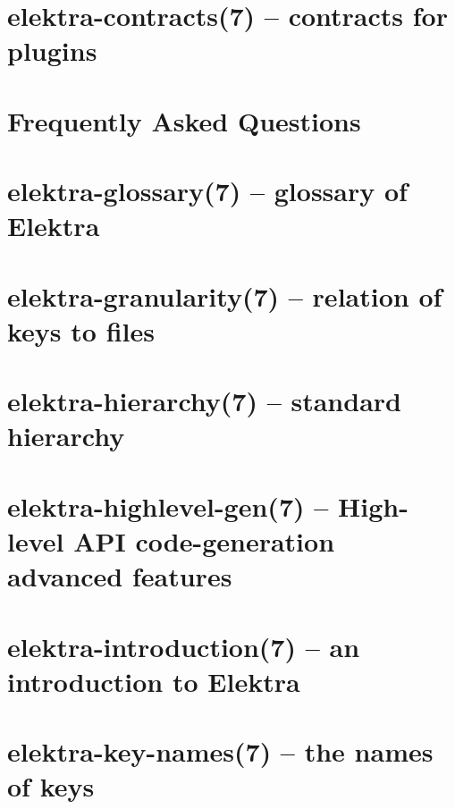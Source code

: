 \let\mypdfximage\pdfximage\def\pdfximage{\immediate\mypdfximage}\documentclass[twoside]{book}
\newcommand{\+}{\discretionary{\mbox{\scriptsize$\hookleftarrow$}}{}{}}
\begin{document}
\chapter{elektra-\/contracts(7) -- contracts for plugins}
\label{doc_help_elektra-contracts_md}

\chapter{Frequently Asked Questions}
\label{doc_help_elektra-faq_md}

\chapter{elektra-\/glossary(7) -- glossary of Elektra}
\label{doc_help_elektra-glossary_md}

\chapter{elektra-\/granularity(7) -- relation of keys to files}
\label{doc_help_elektra-granularity_md}

\chapter{elektra-\/hierarchy(7) -- standard hierarchy}
\label{doc_help_elektra-hierarchy_md}

\chapter{elektra-\/highlevel-\/gen(7) -- High-\/level API code-\/generation advanced features}
\label{doc_help_elektra-highlevel-gen_md}

\chapter{elektra-\/introduction(7) -- an introduction to Elektra}
\label{doc_help_elektra-introduction_md}

\chapter{elektra-\/key-\/names(7) -- the names of keys}
\label{doc_help_elektra-key-names_md}

\end{document}
